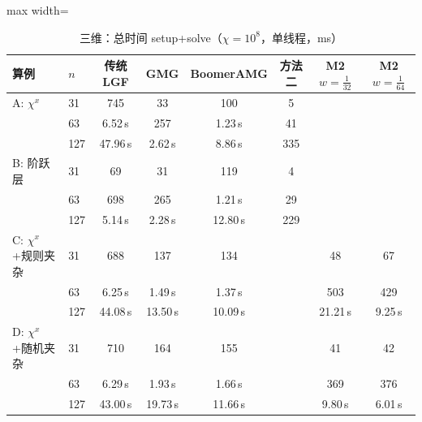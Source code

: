 \begin{table}[H]\centering\small
\caption{三维：总时间 setup+solve（$\chi=10^8$，单线程，ms）}\label{tab:time3d}
\begin{adjustbox}{max width=\textwidth}
\begin{tabular}{llcccccc}
\toprule
算例 & $n$ & 传统 LGF & GMG & BoomerAMG & 方法二 & M2 $w{=}\frac1{32}$ & M2 $w{=}\frac1{64}$ \\
\midrule
A: $\chi^x$ & 31 & 745 & 33 & 100 & 5 &  &  \\
 & 63 & 6.52\,s & 257 & 1.23\,s & 41 &  &  \\
 & 127 & 47.96\,s & 2.62\,s & 8.86\,s & 335 &  &  \\
\midrule
B: 阶跃层 & 31 & 69 & 31 & 119 & 4 &  &  \\
 & 63 & 698 & 265 & 1.21\,s & 29 &  &  \\
 & 127 & 5.14\,s & 2.28\,s & 12.80\,s & 229 &  &  \\
\midrule
C: $\chi^x$+规则夹杂 & 31 & 688 & 137 & 134 &  & 48 & 67 \\
 & 63 & 6.25\,s & 1.49\,s & 1.37\,s &  & 503 & 429 \\
 & 127 & 44.08\,s & 13.50\,s & 10.09\,s &  & 21.21\,s & 9.25\,s \\
\midrule
D: $\chi^x$+随机夹杂 & 31 & 710 & 164 & 155 &  & 41 & 42 \\
 & 63 & 6.29\,s & 1.93\,s & 1.66\,s &  & 369 & 376 \\
 & 127 & 43.00\,s & 19.73\,s & 11.66\,s &  & 9.80\,s & 6.01\,s \\
\bottomrule
\end{tabular}
\end{adjustbox}
\end{table}

